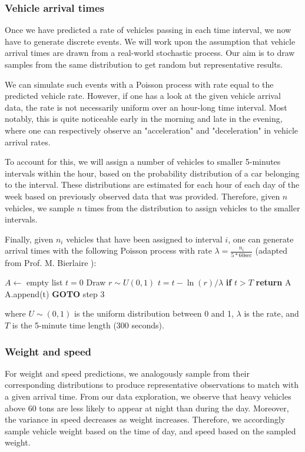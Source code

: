 \documentclass[10pt,conference,compsocconf]{IEEEtran}
\begin{document}
\subsubsection{Vehicle arrival times}
Once we have predicted a rate of vehicles passing in each time interval, we now have to generate discrete events. We will work upon the assumption that vehicle arrival times are drawn from a real-world stochastic process. Our aim is to draw samples from the same distribution to get random but representative results.

We can simulate such events with a Poisson process \cite{poisson} with rate equal to the predicted vehicle rate. However, if one has a look at the given vehicle arrival data, the rate is not necessarily uniform over an hour-long time interval. Most notably, this is quite noticeable early in the morning and late in the evening, where one can respectively observe an "acceleration" and "deceleration" in vehicle arrival rates.

To account for this, we will assign a number of vehicles to smaller 5-minutes intervals within the hour, based on the probability distribution of a car belonging to the interval. These distributions are estimated for each hour of each day of the week based on previously observed data that was provided. Therefore, given $n$ vehicles, we sample $n$ times from the distribution to assign vehicles to the smaller intervals. 

Finally, given $n_i$ vehicles that have been assigned to interval $i$, one can generate arrival times with the following Poisson process with rate $\lambda = \frac{n_i}{5*60 \textrm{sec}}$ (adapted from Prof. M. Bierlaire \cite{poisson}):
\begin{algorithmic}[1]
    \State $A \gets $ empty list
    \State $t = 0$
    \State Draw $r \sim U(0,1)$
    \State $t = t - \ln(r) / \lambda$
    \State \textbf{if} $t > T$ \textbf{return} A
    \State A.append(t)
    \State \textbf{GOTO} step 3
\end{algorithmic}

where $U\sim(0,1)$ is the uniform distribution between 0 and 1, $\lambda$ is the rate, and $T$ is the 5-minute time length ($300$ seconds).

\subsubsection{Weight and speed}

For weight and speed predictions, we analogously sample from their corresponding distributions to produce representative observations to match with a given arrival time. From our data exploration, we observe that heavy vehicles above 60 tons are less likely to appear at night than during the day. Moreover, the variance in speed decreases as weight increases. Therefore, we accordingly sample vehicle weight based on the time of day, and speed based on the sampled weight.
\end{document}
